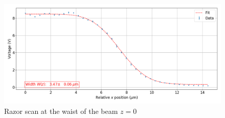 \begin{figure}
\centering
\includegraphics[width=1\textwidth]{img/razorscan}
\caption{Razor scan at the waist of the beam $z=0$}
\label{examplerazorscan}
\end{figure}


